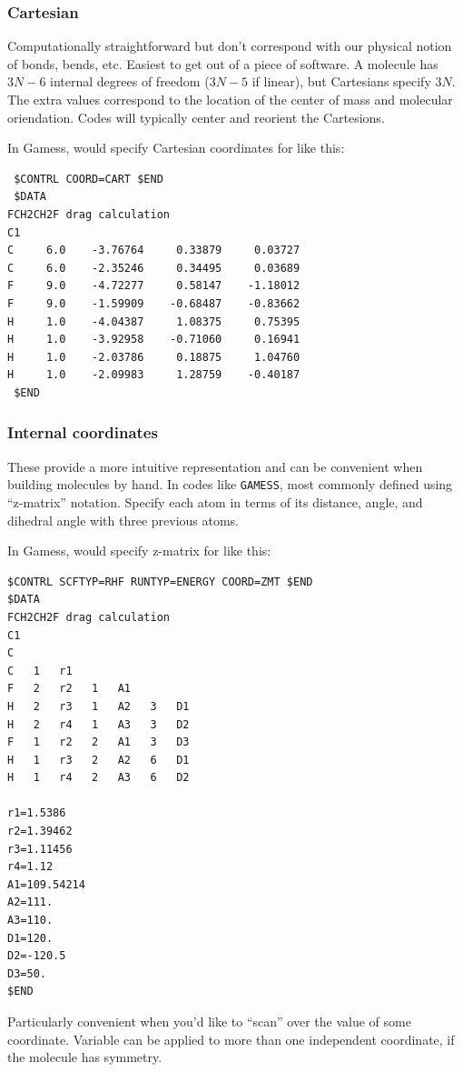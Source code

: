 \documentclass[11pt]{article}
\begin{document}
\subsubsection{Cartesian}
\label{sec:org8155abf}
Computationally straightforward but don't correspond with our physical notion of bonds,
bends, etc.  Easiest to get out of a piece of software.  A molecule has \(3 N-6\) internal degrees of freedom (\(3N-5\) if linear), but Cartesians specify \(3N\).  The extra values correspond to the location of the center of mass and molecular oriendation.  Codes will typically center and reorient the Cartesions.

In Gamess, would specify Cartesian coordinates for  like this:
\begin{verbatim}
 $CONTRL COORD=CART $END
 $DATA
FCH2CH2F drag calculation
C1
C     6.0    -3.76764     0.33879     0.03727
C     6.0    -2.35246     0.34495     0.03689
F     9.0    -4.72277     0.58147    -1.18012
F     9.0    -1.59909    -0.68487    -0.83662
H     1.0    -4.04387     1.08375     0.75395
H     1.0    -3.92958    -0.71060     0.16941
H     1.0    -2.03786     0.18875     1.04760
H     1.0    -2.09983     1.28759    -0.40187
 $END
\end{verbatim}
\subsubsection{Internal coordinates}
\label{sec:orgb4da33b}
These provide a more intuitive representation and can be convenient when building molecules by hand.  In codes like \texttt{GAMESS}, most commonly defined using ``z-matrix'' notation. Specify  each atom in terms of its distance, angle, and dihedral angle with three previous atoms.

In Gamess, would specify z-matrix for  like this:
\begin{verbatim}
$CONTRL SCFTYP=RHF RUNTYP=ENERGY COORD=ZMT $END
$DATA
FCH2CH2F drag calculation
C1
C
C   1   r1
F   2   r2   1   A1
H   2   r3   1   A2   3   D1
H   2   r4   1   A3   3   D2
F   1   r2   2   A1   3   D3
H   1   r3   2   A2   6   D1
H   1   r4   2   A3   6   D2

r1=1.5386
r2=1.39462
r3=1.11456
r4=1.12
A1=109.54214
A2=111.
A3=110.
D1=120.
D2=-120.5
D3=50.
$END
\end{verbatim}
Particularly convenient when you'd like to ``scan'' over the value of some coordinate.  Variable can be applied to more than one independent coordinate, if the molecule has symmetry.
\end{document}

